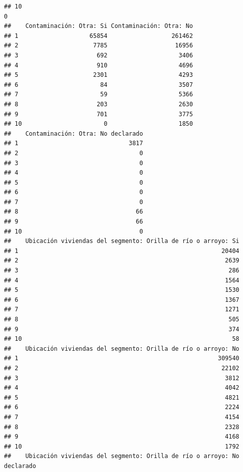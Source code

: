 \documentclass[11pt,]{article}
\begin{document}
\begin{verbatim}
## 10                                                                     0
##    Contaminación: Otra: Si Contaminación: Otra: No
## 1                    65854                  261462
## 2                     7785                   16956
## 3                      692                    3406
## 4                      910                    4696
## 5                     2301                    4293
## 6                       84                    3507
## 7                       59                    5366
## 8                      203                    2630
## 9                      701                    3775
## 10                       0                    1850
##    Contaminación: Otra: No declarado
## 1                               3817
## 2                                  0
## 3                                  0
## 4                                  0
## 5                                  0
## 6                                  0
## 7                                  0
## 8                                 66
## 9                                 66
## 10                                 0
##    Ubicación viviendas del segmento: Orilla de río o arroyo: Si
## 1                                                         20404
## 2                                                          2639
## 3                                                           286
## 4                                                          1564
## 5                                                          1530
## 6                                                          1367
## 7                                                          1271
## 8                                                           505
## 9                                                           374
## 10                                                           58
##    Ubicación viviendas del segmento: Orilla de río o arroyo: No
## 1                                                        309540
## 2                                                         22102
## 3                                                          3812
## 4                                                          4042
## 5                                                          4821
## 6                                                          2224
## 7                                                          4154
## 8                                                          2328
## 9                                                          4168
## 10                                                         1792
##    Ubicación viviendas del segmento: Orilla de río o arroyo: No declarado

\end{verbatim}
\end{document}
